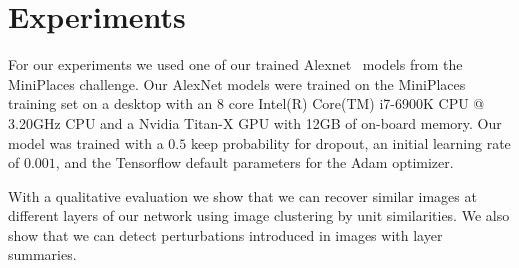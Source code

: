 \section{Experiments}
\label{s:experiments}

For our experiments we used one of our trained Alexnet~\cite{alexnet} models from the MiniPlaces challenge. Our AlexNet models were trained on the MiniPlaces training set on a desktop with an 8 core Intel(R) Core(TM) i7-6900K CPU @ 3.20GHz CPU and a Nvidia Titan-X GPU with 12GB of on-board memory. Our model was trained with a  $0.5$ keep probability for dropout, an initial learning rate of $0.001$, and the Tensorflow default parameters for the Adam optimizer. 

With a qualitative evaluation we show that we can recover similar images at different layers of our network using image clustering by unit similarities. We also show that we can detect perturbations introduced in images with layer summaries.






